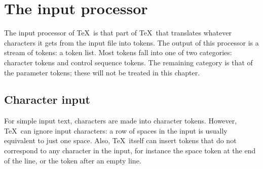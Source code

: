 \documentclass[letterpaper]{book}
\begin{document}
\section{The input processor}

The input processor of \TeX\ is that part of \TeX\ that
translates whatever characters it gets from the input file
into tokens. The output of this processor is a stream
of tokens: a token list. Most tokens fall into one of two categories:
character tokens and control sequence tokens. 
The remaining category is that of the parameter tokens;
these will not be treated in this chapter.

\subsection{Character input}

For simple input text, characters are made into
character tokens. However, \TeX\ can ignore input characters:
a row of spaces in the input is usually equivalent to just one
space. Also, \TeX\ itself can insert tokens that do not correspond
to any character in the input, for instance the space token
at the end of the line, or the  token after an empty line.
\end{document}
